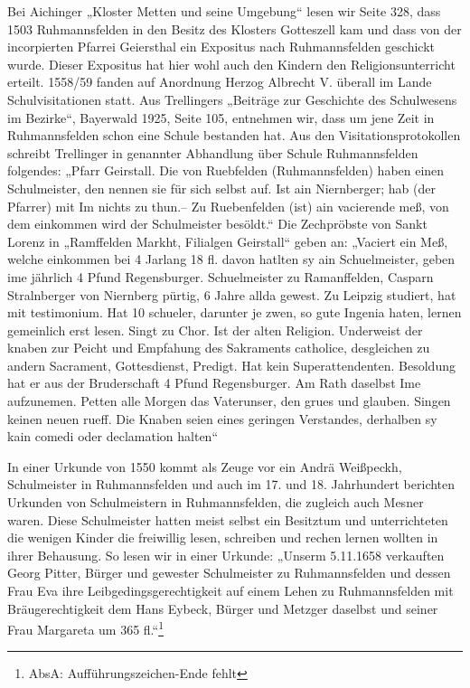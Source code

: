\documentclass[12pt,a4paper]{book}
\begin{document}
Bei Aichinger „Kloster Metten und seine Umgebung“ lesen wir Seite 328,
dass 1503 Ruhmannsfelden in den Besitz des Klosters Gotteszell kam und
dass von der incorpierten Pfarrei Geiersthal ein Expositus nach
Ruhmannsfelden geschickt wurde. Dieser Expositus hat hier wohl auch den
Kindern den Religionsunterricht erteilt. 1558/59 fanden auf Anordnung
Herzog Albrecht V. überall im Lande Schulvisitationen statt. Aus
Trellingers „Beiträge zur Geschichte des Schulwesens im Bezirke“,
Bayerwald 1925, Seite 105, entnehmen wir, dass um jene Zeit in
Ruhmannsfelden schon eine Schule bestanden hat. Aus den
Visitationsprotokollen schreibt Trellinger in genannter Abhandlung über
Schule Ruhmannsfelden folgendes: „Pfarr Geirstall. Die von Ruebfelden
(Ruhmannsfelden) haben einen Schulmeister, den nennen sie für sich
selbst auf. Ist ain Niernberger; hab (der Pfarrer) mit Im nichts zu
thun.--  Zu Ruebenfelden (ist) ain vacierende meß, von dem einkommen
wird der Schulmeister besöldt.“ Die Zechpröbste von Sankt Lorenz in
„Ramffelden Markht, Filialgen Geirstall“ geben an: „Vaciert ein Meß,
welche einkommen bei 4 Jarlang 18 fl. davon hatlten sy ain
Schuelmeister, geben ime jährlich 4 Pfund Regensburger. Schuelmeister zu
Ramanffelden, Casparn Stralnberger von Niernberg pürtig, 6 Jahre allda
gewest. Zu Leipzig studiert, hat mit testimonium. Hat 10 schueler,
darunter je zwen, so gute Ingenia haten, lernen gemeinlich erst lesen.
Singt zu Chor. Ist der alten Religion. Underweist der knaben zur Peicht
und Empfahung des Sakraments catholice, desgleichen zu andern Sacrament,
Gottesdienst, Predigt. Hat kein Superattendenten. Besoldung hat er aus
der Bruderschaft 4 Pfund Regensburger. Am Rath daselbst Ime aufzunemen.
Petten alle Morgen das Vaterunser, den grues und glauben. Singen keinen
neuen rueff. Die Knaben seien eines geringen Verstandes, derhalben sy
kain comedi oder declamation halten“

In einer Urkunde von 1550 kommt als Zeuge vor ein Andrä Weißpeckh,
Schulmeister in Ruhmannsfelden und auch im 17. und 18. Jahrhundert
berichten Urkunden von Schulmeistern in Ruhmannsfelden, die zugleich
auch Mesner waren. Diese Schulmeister hatten meist selbst ein Besitztum
und unterrichteten die wenigen Kinder die freiwillig lesen, schreiben
und rechen lernen wollten in ihrer Behausung. So lesen wir in einer
Urkunde: „Unserm 5.11.1658 verkauften Georg Pitter, Bürger und gewester
Schulmeister zu Ruhmannsfelden und dessen Frau Eva ihre
Leibgedingsgerechtigkeit auf einem Lehen zu Ruhmannsfelden mit
Bräugerechtigkeit dem Hans Eybeck, Bürger und Metzger daselbst und
seiner Frau Margareta um 365 fl.“\footnote{AbsA: Aufführungszeichen-Ende
fehlt}
\end{document}
